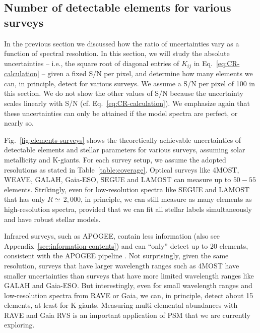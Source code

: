\documentclass[iop]{emulateapj}
\begin{document}
\begin{CJK*}{UTF8}{gbsn}
%
%
%
%
%
%

\vspace{1cm}
\subsection{Number of detectable elements for various surveys}
\label{sec:detectable-elements}

In the previous section we discussed how the ratio of uncertainties vary as a function of spectral resolution. In this section, we will study the absolute uncertainties -- i.e., the square root of diagonal entries of $K_{ij}$ in Eq.~\ref{eq:CR-calculation} -- given a fixed S/N per pixel, and determine how many elements we can, in principle, detect for various surveys. We assume a S/N per pixel of 100 in this section. We do not show the other values of S/N because the uncertainty scales linearly with S/N (cf. Eq.~\ref{eq:CR-calculation}).  We emphasize again that these uncertainties can only be attained if the model spectra are perfect, or nearly so. 

Fig.~\ref{fig:elements-surveys} shows the theoretically achievable uncertainties of detectable elements and stellar parameters for various surveys, assuming solar metallicity and K-giants. For each survey setup, we assume the adopted resolutions as stated in Table~\ref{table:coverage}. Optical surveys like 4MOST, WEAVE, GALAH, Gaia-ESO, SEGUE and LAMOST can measure up to $50-55$ elements. Strikingly, even for low-resolution spectra like SEGUE and LAMOST that has only $R \simeq \,$2$,$000, in principle, we can still measure as many elements as high-resolution spectra, provided that we can fit all stellar labels simultaneously and have robust stellar models. 

Infrared surveys, such as APOGEE, contain less information (also see Appendix~\ref{sec:information-contents}) and can ``only'' detect up to $20$ elements, consistent with the APOGEE pipeline \citep{hol15,sds16}. Not surprisingly, given the same resolution, surveys that have larger wavelength ranges such as 4MOST have smaller uncertainties than surveys that have more limited wavelength ranges like GALAH and Gaia-ESO. But interestingly, even for small wavelength ranges and low-resolution spectra from RAVE or Gaia, we can, in principle, detect about 15 elements, at least for K-giants. Measuring multi-elemental abundances with RAVE and Gaia RVS is an important application of PSM that we are currently exploring. 


\end{CJK*}
\end{document}
